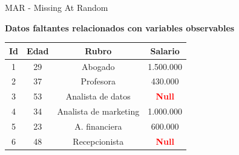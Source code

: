\documentclass{beamer}
\begin{document}
\begin{frame}{MAR - Missing At Random}
    \begin{center}
        \textbf{Datos faltantes relacionados con variables observables}
    \end{center}
    
    \vspace{0.3cm}
    
    \begin{center}
    \begin{tabular}{|c|c|c|c|}
    \hline
    \textbf{Id} & \textbf{Edad} & \textbf{Rubro} & \textbf{Salario} \\
    \hline
    1 & 29 & Abogado & 1.500.000 \\
    \hline
    2 & 37 & Profesora & 430.000 \\
    \hline
    3 & 53 & Analista de datos & \textcolor{red}{\textbf{Null}} \\
    \hline
    4 & 34 & Analista de marketing & 1.000.000 \\
    \hline
    5 & 23 & A. financiera & 600.000 \\
    \hline
    6 & 48 & Recepcionista & \textcolor{red}{\textbf{Null}} \\
    \hline
    \end{tabular}
    \end{center}
    
    \vspace{0.3cm}
    
\end{frame}
\end{document}
